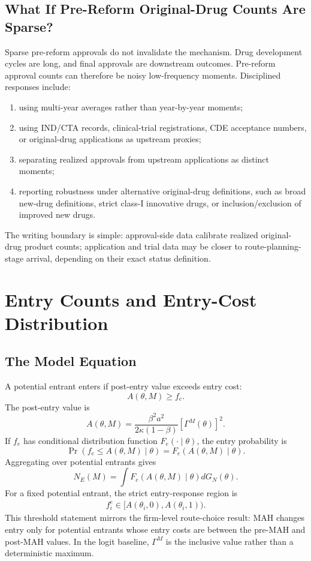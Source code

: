 \documentclass[12pt]{article}
\newcommand{\1}{\mathbf{1}}
\begin{document}
\subsection{What If Pre-Reform Original-Drug Counts Are Sparse?}

Sparse pre-reform approvals do not invalidate the mechanism. Drug development cycles are long, and final approvals are downstream outcomes. Pre-reform approval counts can therefore be noisy low-frequency moments. Disciplined responses include:
\begin{enumerate}[leftmargin=2em]
    \item using multi-year averages rather than year-by-year moments;
    \item using IND/CTA records, clinical-trial registrations, CDE acceptance numbers, or original-drug applications as upstream proxies;
    \item separating realized approvals from upstream applications as distinct moments;
    \item reporting robustness under alternative original-drug definitions, such as broad new-drug definitions, strict class-I innovative drugs, or inclusion/exclusion of improved new drugs.
\end{enumerate}

The writing boundary is simple: approval-side data calibrate realized original-drug product counts; application and trial data may be closer to route-planning-stage arrival, depending on their exact status definition.

\section{Entry Counts and Entry-Cost Distribution}

\subsection{The Model Equation}

A potential entrant enters if post-entry value exceeds entry cost:
\[
    A(\theta,M)\ge f_e.
\]
The post-entry value is
\[
    A(\theta,M)
    =
    \frac{\beta^2 a^2}{2\kappa(1-\beta)}
    [\Gamma^M(\theta)]^2.
\]
If $f_e$ has conditional distribution function $F_e(\cdot\mid\theta)$, the entry probability is
\[
    \Pr(f_e\le A(\theta,M)\mid\theta)
    =
    F_e(A(\theta,M)\mid\theta).
\]
Aggregating over potential entrants gives
\[
    N_E(M)=
    \int
    F_e(A(\theta,M)\mid\theta)
    dG_N(\theta).
\]
For a fixed potential entrant, the strict entry-response region is
\begin{align*}
    f_i^e
    \in
    [A(\theta_i,0),A(\theta_i,1)).
\end{align*}
This threshold statement mirrors the firm-level route-choice result: MAH changes entry only for potential entrants whose entry costs are between the pre-MAH and post-MAH values. In the logit baseline, $\Gamma^M$ is the inclusive value rather than a deterministic maximum.
\end{document}
